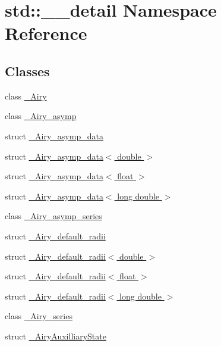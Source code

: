 \hypertarget{namespacestd_1_1____detail}{}\section{std\+:\+:\+\_\+\+\_\+detail Namespace Reference}
\label{namespacestd_1_1____detail}
\subsection*{Classes}
\begin{DoxyCompactItemize}
\item 
class \hyperlink{classstd_1_1____detail_1_1__Airy}{\+\_\+\+Airy}
\item 
class \hyperlink{classstd_1_1____detail_1_1__Airy__asymp}{\+\_\+\+Airy\+\_\+asymp}
\item 
struct \hyperlink{structstd_1_1____detail_1_1__Airy__asymp__data}{\+\_\+\+Airy\+\_\+asymp\+\_\+data}
\item 
struct \hyperlink{structstd_1_1____detail_1_1__Airy__asymp__data_3_01double_01_4}{\+\_\+\+Airy\+\_\+asymp\+\_\+data$<$ double $>$}
\item 
struct \hyperlink{structstd_1_1____detail_1_1__Airy__asymp__data_3_01float_01_4}{\+\_\+\+Airy\+\_\+asymp\+\_\+data$<$ float $>$}
\item 
struct \hyperlink{structstd_1_1____detail_1_1__Airy__asymp__data_3_01long_01double_01_4}{\+\_\+\+Airy\+\_\+asymp\+\_\+data$<$ long double $>$}
\item 
class \hyperlink{classstd_1_1____detail_1_1__Airy__asymp__series}{\+\_\+\+Airy\+\_\+asymp\+\_\+series}
\item 
struct \hyperlink{structstd_1_1____detail_1_1__Airy__default__radii}{\+\_\+\+Airy\+\_\+default\+\_\+radii}
\item 
struct \hyperlink{structstd_1_1____detail_1_1__Airy__default__radii_3_01double_01_4}{\+\_\+\+Airy\+\_\+default\+\_\+radii$<$ double $>$}
\item 
struct \hyperlink{structstd_1_1____detail_1_1__Airy__default__radii_3_01float_01_4}{\+\_\+\+Airy\+\_\+default\+\_\+radii$<$ float $>$}
\item 
struct \hyperlink{structstd_1_1____detail_1_1__Airy__default__radii_3_01long_01double_01_4}{\+\_\+\+Airy\+\_\+default\+\_\+radii$<$ long double $>$}
\item 
class \hyperlink{classstd_1_1____detail_1_1__Airy__series}{\+\_\+\+Airy\+\_\+series}
\item 
struct \hyperlink{structstd_1_1____detail_1_1__AiryAuxilliaryState}{\+\_\+\+Airy\+Auxilliary\+State}

\end{DoxyCompactItemize}
